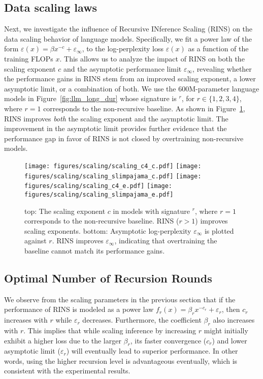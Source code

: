 
\subsection{Data scaling laws}
Next, we investigate the influence of Recursive INference Scaling (RINS) on the data scaling behavior of language models. Specifically, we fit a power law of the form $\varepsilon(x)=\beta x^{-c}+\varepsilon_\infty$, to the log-perplexity loss $\varepsilon(x)$ as a function of the training FLOPs $x$. This allows us to analyze the impact of RINS on both the scaling exponent $c$ and the asymptotic performance limit $\varepsilon_\infty$, revealing whether the performance gains in RINS stem from an improved scaling exponent, a lower asymptotic limit, or a combination of both. We use the 600M-parameter language models in Figure~\ref{fig:llm_long_dur} whose signature is \A$^r$\B, for $r\in\{1, 2, 3, 4\}$, where $r=1$ corresponds to the non-recursive baseline. As shown in Figure~\ref{fig:scaling}, RINS improves \emph{both} the scaling exponent and the asymptotic limit. The improvement in the asymptotic limit provides further evidence that the performance gap in favor of RINS is not closed by overtraining non-recursive models.

\begin{figure}[t]
    \centering
    \texttt{[image: figures/scaling/scaling\_c4\_c.pdf]}
    \texttt{[image: figures/scaling/scaling\_slimpajama\_c.pdf]}
    \texttt{[image: figures/scaling/scaling\_c4\_e.pdf]}
    \texttt{[image: figures/scaling/scaling\_slimpajama\_e.pdf]}
    \caption{{\sc top:} The scaling exponent $c$ in models with signature \A$^r$\B, where $r=1$ corresponds to the non-recursive baseline. RINS ($r > 1$) improves scaling exponents. {\sc bottom:} Asymptotic log-perplexity  $\varepsilon_\infty$ is plotted against $r$. RINS improves $\varepsilon_\infty$, indicating that overtraining the baseline cannot match its performance gains.}
    \label{fig:scaling}
\end{figure}

\subsection{Optimal Number of Recursion Rounds}
We observe from the scaling parameters in the previous section that if the performance of RINS is modeled as a power law $f_{r}(x) = \beta_r x^{-c_r}+\varepsilon_r$, then $c_r$ increases with $r$ while $\varepsilon_r$ decreases.  Furthermore, the coefficient $\beta_r$ also increases with $r$. This implies that while scaling inference by increasing $r$ might initially exhibit a higher loss due to the larger $\beta_r$, its faster convergence ($c_r$) and lower asymptotic limit ($\varepsilon_r$) will eventually lead to superior performance. In other words, using the higher recursion level is advantageous eventually, which is consistent with the experimental results.


